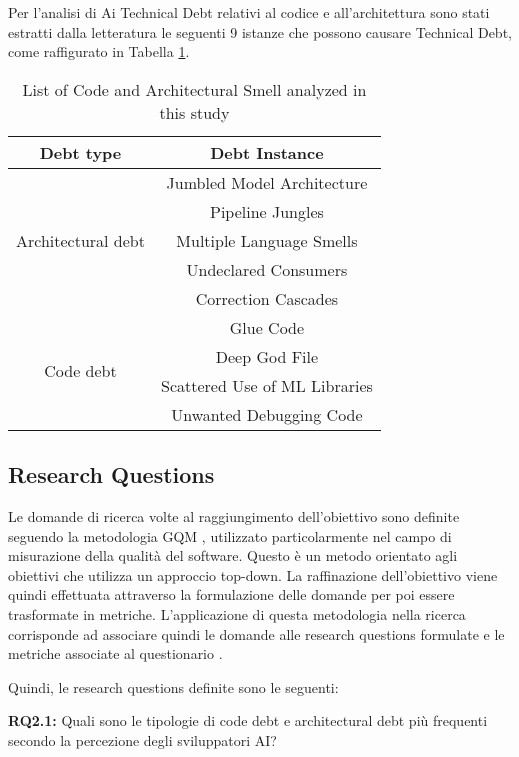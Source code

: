Per l'analisi di Ai Technical Debt relativi al codice e all'architettura sono stati estratti dalla letteratura le seguenti 9 istanze che possono causare Technical Debt, come raffigurato in Tabella \ref{tab:code_architectural smells}. 
\begin{table}[h]
    \centering
    \begin{tabular}{|c|c|}
    \hline
    \textbf{Debt type} & \textbf{Debt Instance}\\
    \hline
    \multirow{5}{*}{Architectural debt}
         & Jumbled Model Architecture \\
         & Pipeline Jungles \\
         & Multiple Language Smells \\
         & Undeclared Consumers \\
         & Correction Cascades \\
         \hline
    \multirow{4}{*}{Code debt}
         & Glue Code \\
         & Deep God File \\
         & Scattered Use of ML Libraries \\
         & Unwanted Debugging Code \\
        \hline
    \end{tabular}
    \caption{List of Code and Architectural Smell analyzed in this study}
    \label{tab:code_architectural smells}
\end{table}

\subsection{Research Questions}
Le domande di ricerca volte al raggiungimento dell'obiettivo sono definite seguendo la metodologia GQM \cite{Solingen}, utilizzato particolarmente nel campo di misurazione della qualità del software.
Questo è un metodo orientato agli obiettivi che utilizza un approccio top-down. 
La raffinazione dell'obiettivo viene quindi effettuata attraverso la formulazione delle domande per poi essere trasformate in metriche.
L'applicazione di questa metodologia nella ricerca corrisponde ad associare quindi le domande alle research questions formulate e le metriche associate al questionario \cite{Ciolkowski2003PracticalEI}.

Quindi, le research questions definite sono le seguenti:
\break
\begin{rqbox}
\textbf{RQ2.1:} Quali sono le tipologie di code debt e architectural debt più frequenti secondo la percezione degli sviluppatori AI?
\end{rqbox}

